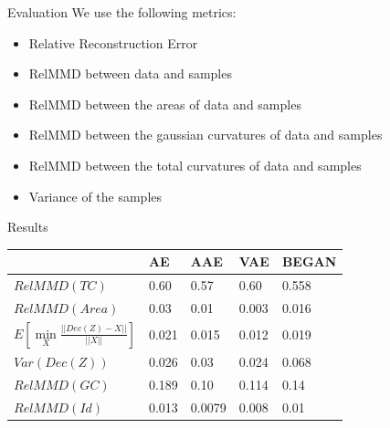 \documentclass{beamer}
\begin{document}
\begin{frame}{Evaluation}
We use the following metrics:
\begin{itemize}
\item Relative Reconstruction Error
\item RelMMD between data and samples
\item RelMMD between the areas of data and samples
\item RelMMD between the gaussian curvatures of data and samples
\item RelMMD between the total curvatures of data and samples
\item Variance of the samples
\end{itemize}
\end{frame}
\begin{frame}{Results}
\begin{table}[H]
\begin{tabular}{|l|l|l|l|l|}
\hline
&   AE & AAE &  VAE &  BEGAN  \\ \hline
$RelMMD(TC)$ &  0.60 &  0.57  & 0.60 & 0.558 \\ \hline
$RelMMD(Area)$  &  0.03 &  0.01 & 0.003 &  0.016  \\ \hline
$E[\min\limits_{X} \frac{||Dec(Z)-X||}{||X||}]$&  0.021 & 0.015 &  0.012 &  0.019   \\ \hline
$Var(Dec(Z))$& 0.026 &   0.03 &  0.024 &  0.068  \\ \hline
$RelMMD(GC)$ & 0.189 & 0.10 &  0.114 &  0.14  \\ \hline
$RelMMD(Id)$ &  0.013 &  0.0079 &  0.008 &  0.01 \\ \hline
\end{tabular}
\end{table}

\end{frame}
\end{document}
